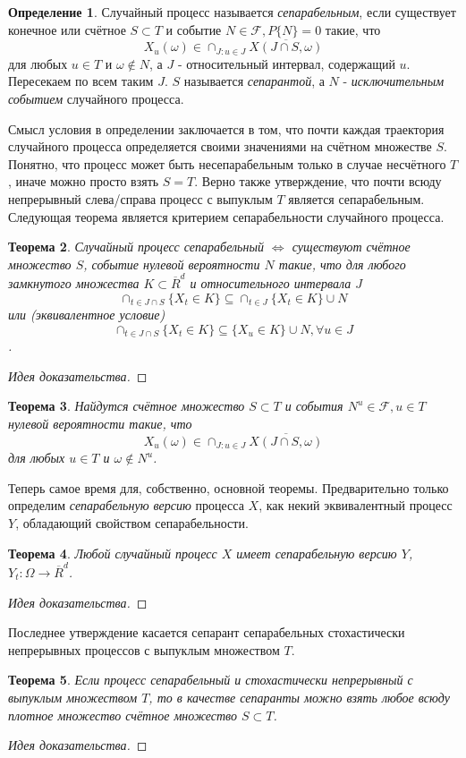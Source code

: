 \documentclass[16pt]{article}
\newtheorem{theorem}{Теорема}[section]
\theoremstyle{definition}
\newtheorem{definition}[theorem]{Определение}
\begin{document}
\begin{definition}
Случайный процесс называется \textit{сепарабельным}, если существует конечное или счётное $S \subset T$ и событие $N \in \mathcal{F}, P\{N\} = 0$ такие, что $$X_u(\omega) \in \cap_{J: u \in J} \overline{X(J \cap S, \omega)}$$ для любых $u \in T$ и $\omega \notin N$, а $J$ - относительный интервал, содержащий $u$. Пересекаем по всем таким $J$. $S$ называется \textit{сепарантой}, а $N$ - \textit{исключительным событием} случайного процесса.
\end{definition}
Смысл условия в определении заключается в том, что почти каждая траектория случайного процесса определяется своими значениями на счётном множестве $S$. Понятно, что процесс может быть несепарабельным только в случае несчётного $T$, иначе можно просто взять $S = T$. Верно также утверждение, что почти всюду непрерывный слева/справа процесс с выпуклым $T$ является сепарабельным.
Следующая теорема является критерием сепарабельности случайного процесса.
\begin{theorem}
Случайный процесс сепарабельный $\Longleftrightarrow$ существуют счётное множество $S$, событие нулевой вероятности $N$ такие, что для любого замкнутого множества $K \subset \overline{R}^d$ и относительного интервала $J$ $$\cap_{t \in J \cap S}\{X_t \in K\} \subseteq \cap_{t \in J}\{X_t \in K\} \cup N$$ или (эквивалентное условие) $$\cap_{t \in J \cap S}\{X_t \in K\} \subseteq \{X_u \in K\} \cup N, \forall u \in J$$.
\end{theorem}
\begin{proof}[Идея доказательства]

\end{proof}
\begin{theorem}
Найдутся счётное множество $S \subset T$ и события $N^u \in \mathcal{F}, u \in T$ нулевой вероятности такие, что $$X_u(\omega) \in \cap_{J: u \in J} \overline{X(J \cap S, \omega)}$$ для любых $u \in T$ и $\omega \notin N^u$.
\end{theorem}
Теперь самое время для, собственно, основной теоремы. Предварительно только определим \textit{сепарабельную версию} процесса $X$, как некий эквивалентный процесс $Y$, обладающий свойством сепарабельности. 
\begin{theorem}
Любой случайный процесс $X$ имеет сепарабельную версию $Y$, $Y_t:\Omega \rightarrow \overline{R}^d$.
\end{theorem}
\begin{proof}[Идея доказательства]

\end{proof}
Последнее утверждение касается сепарант сепарабельных стохастически непрерывных процессов с выпуклым множеством $T$.
\begin{theorem}
Если процесс сепарабельный и стохастически непрерывный с выпуклым множеством $T$, то в качестве сепаранты можно взять любое всюду плотное множество счётное множество $S \subset T$.
\end{theorem}
\begin{proof}[Идея доказательства]

\end{proof}
\end{document}
